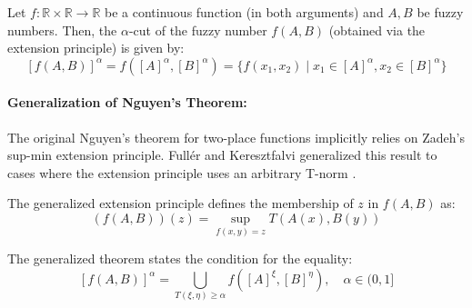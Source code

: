 \begin{theorem}
    Let $f: \mathbb{R} \times \mathbb{R} \to \mathbb{R}$ be a continuous function (in both arguments) and $A, B$ be fuzzy numbers. Then, the $\alpha$-cut of the fuzzy number $f(A,B)$ (obtained via the extension principle) is given by:
    \[
    [f(A,B)]^{\alpha} = f([A]^{\alpha}, [B]^{\alpha}) = \{f(x_1, x_2) \mid x_1 \in [A]^\alpha, x_2 \in [B]^\alpha\}
    \]
\end{theorem}

\paragraph{Generalization of Nguyen's Theorem:}
The original Nguyen's theorem for two-place functions implicitly relies on Zadeh's sup-min extension principle. Fullér and Keresztfalvi generalized this result to cases where the extension principle uses an arbitrary T-norm \cite[Sec. 1.9]{FULLER2}.

The generalized extension principle defines the membership of $z$ in $f(A,B)$ as:
\[
(f(A,B))(z) = \sup_{f(x,y)=z} T(A(x), B(y))
\]

The generalized theorem states the condition for the equality:
\begin{equation} \label{eq:nguyen_generalized}
[f(A, B)]^\alpha = \bigcup_{T(\xi, \eta) \ge \alpha} f([A]^\xi, [B]^\eta), \quad \alpha \in (0, 1]
\end{equation}


